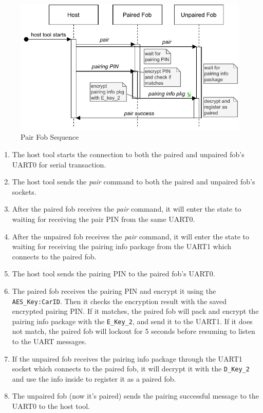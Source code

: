 \documentclass[11pt,oneside,onecolumn,letterpaper]{article}
\begin{document}
\begin{figure}[!htbp]
	\begin{centering}
		\includegraphics[width = .6\textwidth]{pic/pair.pdf}
		\caption{Pair Fob Sequence}
		\label{fig:pair}
	\end{centering}
\end{figure}

\begin{enumerate}
	\item The host tool starts the connection to both the paired and unpaired fob's UART0 for serial transaction.
	\item The host tool sends the \textit{pair} command to both the paired and unpaired fob's sockets.
	\item After the paired fob receives the \textit{pair} command, it will enter the state to waiting for receiving the pair PIN from the same UART0.
	\item After the unpaired fob receives the \textit{pair} command, it will enter the state to waiting for receiving the pairing info package from the UART1 which connects to the paired fob.
	\item The host tool sends the pairing PIN to the paired fob's UART0.
	\item The paired fob receives the pairing PIN and encrypt it using the \verb|AES_Key:CarID|. Then it checks the encryption result with the saved encrypted pairing PIN. If it matches, the paired fob will pack and encrypt the pairing info package with the \verb|E_Key_2|, and send it to the UART1. If it does not match, the paired fob will lockout for 5 seconds before resuming to listen to the UART messages.
	\item If the unpaired fob receives the pairing info package through the UART1 socket which connects to the paired fob, it will decrypt it with the \verb|D_Key_2| and use the info inside to register it as a paired fob.
	\item The unpaired fob (now it's paired) sends the pairing successful message to the UART0 to the host tool.
\end{enumerate}
\end{document}
